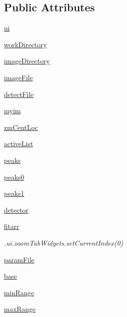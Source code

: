 \subsection*{Public Attributes}
\begin{DoxyCompactItemize}
\item 
\hyperlink{class_atrex_1_1_atrex_a35cabdfa4a6164da07e19c4b4ed957aa}{ui}
\item 
\hyperlink{class_atrex_1_1_atrex_aba7d9d2058a5bdace86c305ecd35ad3b}{work\-Directory}
\item 
\hyperlink{class_atrex_1_1_atrex_a3a5510d39868ddfaae38841e8057394a}{image\-Directory}
\item 
\hyperlink{class_atrex_1_1_atrex_a6c50fb1f9133397ae0936d14310edabd}{image\-File}
\item 
\hyperlink{class_atrex_1_1_atrex_ac6283b2b56309698f9b3881fd1cb0ba2}{detect\-File}
\item 
\hyperlink{class_atrex_1_1_atrex_adee5f16f849c0990481863170787811e}{myim}
\item 
\hyperlink{class_atrex_1_1_atrex_a7f2c3002d88c2f13aa3f0f19899a0ab7}{zm\-Cent\-Loc}
\item 
\hyperlink{class_atrex_1_1_atrex_a845e289d7ed3657f89da88d1d53657bc}{active\-List}
\item 
\hyperlink{class_atrex_1_1_atrex_a1fd77da8e55fec3336694f7817bb6cb2}{peaks}
\item 
\hyperlink{class_atrex_1_1_atrex_ad1a660b6c6750e5d21a4c51abffbb2df}{peaks0}
\item 
\hyperlink{class_atrex_1_1_atrex_ace3b741c1a559e2117246a53d3e8f345}{peaks1}
\item 
\hyperlink{class_atrex_1_1_atrex_a47354f98e68c5aadcd988d0a2b476889}{detector}
\item 
\hyperlink{class_atrex_1_1_atrex_a7efc2659254ab5a5f065a5f3fa11ceb9}{fitarr}
\begin{DoxyCompactList}\small\item\em .ui.\-zoom\-Tab\-Widgets.\-set\-Current\-Index(0) \end{DoxyCompactList}\item 
\hyperlink{class_atrex_1_1_atrex_a804307169058c96d52235bacc92d6f09}{param\-File}
\item 
\hyperlink{class_atrex_1_1_atrex_a2080a9ed5c4661217ebd6fa108ef2e68}{base}
\item 
\hyperlink{class_atrex_1_1_atrex_a8cb32e63ba2e1df2a5819e6df5bfd8e9}{min\-Range}
\item 
\hyperlink{class_atrex_1_1_atrex_a240f5adcbd64d4282c41fc884722d453}{max\-Range}

\end{DoxyCompactItemize}
